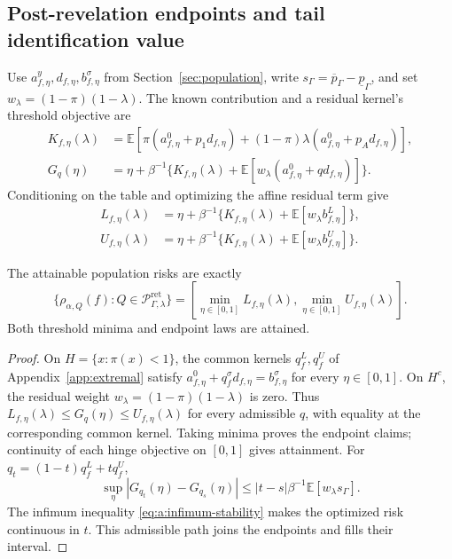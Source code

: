 \subsection{Post-revelation endpoints and tail identification value}
\label{app:tiv}
Use $a^y_{f,\eta},d_{f,\eta},b^\sigma_{f,\eta}$ from Section~\ref{sec:population},
write $s_\Gamma=\overline p_\Gamma-\underline p_\Gamma$, and set
$w_\lambda=(1-\pi)(1-\lambda)$. The known contribution and a residual
kernel's threshold objective are
\begin{align}
 K_{f,\eta}(\lambda)
 &=\mathbb E[\pi(a^0_{f,\eta}+p_1d_{f,\eta})
 +(1-\pi)\lambda(a^0_{f,\eta}+p_Ad_{f,\eta})],
 \label{eq:c-known-contribution}\\
 G_q(\eta)&=\eta+\beta^{-1}\{K_{f,\eta}(\lambda)
 +\mathbb E[w_\lambda(a^0_{f,\eta}+q d_{f,\eta})]\}.
 \label{eq:c-objective-q}
\end{align}
Conditioning on the table and optimizing the affine residual term give
\begin{equation}
 \begin{split}
 L_{f,\eta}(\lambda)&=\eta+\beta^{-1}
 \{K_{f,\eta}(\lambda)+\mathbb E[w_\lambda b^L_{f,\eta}]\},\\
 U_{f,\eta}(\lambda)&=\eta+\beta^{-1}
 \{K_{f,\eta}(\lambda)+\mathbb E[w_\lambda b^U_{f,\eta}]\}.
 \end{split}\label{eq:c-retained-objectives}
\end{equation}
\begin{proposition}\label{prop:c-sharp-endpoints}
The attainable population risks are exactly
\[
 \{\rho_{\alpha,Q}(f):Q\in\mathcal P^{\mathrm{ret}}_{\Gamma,\lambda}\}
 =[\min_{\eta\in[0,1]}L_{f,\eta}(\lambda),
   \min_{\eta\in[0,1]}U_{f,\eta}(\lambda)].
\]
Both threshold minima and endpoint laws are attained.
\end{proposition}
\begin{proof}
On $H=\{x:\pi(x)<1\}$, the common kernels $q_f^L,q_f^U$ of
Appendix~\ref{app:extremal} satisfy
$a^0_{f,\eta}+q_f^\sigma d_{f,\eta}=b^\sigma_{f,\eta}$ for every $\eta\in[0,1]$.
On $H^c$, the residual weight $w_\lambda=(1-\pi)(1-\lambda)$ is zero.
Thus $L_{f,\eta}(\lambda)\leq G_q(\eta)\leq U_{f,\eta}(\lambda)$ for every
admissible $q$, with equality at the corresponding common kernel.
Taking minima proves the endpoint claims;
continuity of each hinge objective on $[0,1]$ gives attainment. For
$q_t=(1-t)q_f^L+tq_f^U$,
\[
 \sup_\eta|G_{q_t}(\eta)-G_{q_s}(\eta)|
 \leq |t-s|\beta^{-1}\mathbb E[w_\lambda s_\Gamma].
\]
The infimum inequality \eqref{eq:a:infimum-stability} makes the optimized risk
continuous in $t$. This admissible path joins the endpoints and fills their interval.
\end{proof}

